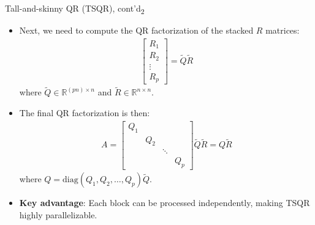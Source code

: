\documentclass[t,usepdftitle=false]{beamer}
\begin{document}
\begin{frame}{Tall-and-skinny QR (TSQR), cont'd\textsubscript{2}}
\begin{itemize}
\item Next, we need to compute the QR factorization of the stacked $R$ matrices:
\begin{align*}
\begin{bmatrix}
R_1 \\
R_2 \\
\vdots \\
R_p
\end{bmatrix} = \tilde{Q} \tilde{R}
\end{align*}
where $\tilde{Q} \in \mathbb{R}^{(pn) \times n}$ and $\tilde{R} \in \mathbb{R}^{n \times n}$.
\item The final QR factorization is then:
\begin{align*}
A = \begin{bmatrix}
Q_1 & & & \\
& Q_2 & & \\
& & \ddots & \\
& & & Q_p
\end{bmatrix} \tilde{Q} \tilde{R} = Q \tilde{R}
\end{align*}
where $Q = \text{diag}(Q_1, Q_2, \ldots, Q_p) \tilde{Q}$.
\item \textbf{Key advantage}: Each block can be processed independently, making TSQR highly parallelizable.
\end{itemize}
\end{frame}
\end{document}
